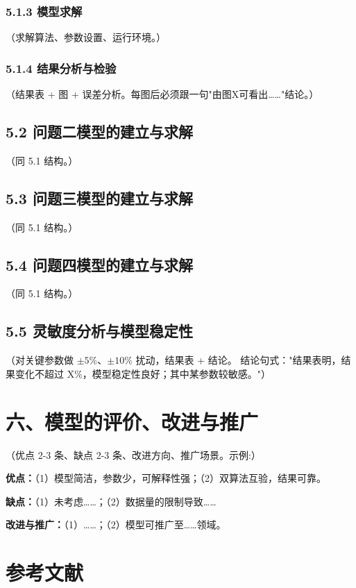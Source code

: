 \documentclass[12pt,a4paper,fontset=windows]{ctexart}
\begin{document}
\subsubsection*{5.1.3 模型求解}
（求解算法、参数设置、运行环境。）

\subsubsection*{5.1.4 结果分析与检验}
（结果表 + 图 + 误差分析。每图后必须跟一句"由图X可看出……"结论。）

\subsection*{5.2 问题二模型的建立与求解}
（同 5.1 结构。）

\subsection*{5.3 问题三模型的建立与求解}
（同 5.1 结构。）

\subsection*{5.4 问题四模型的建立与求解}
（同 5.1 结构。）

\subsection*{5.5 灵敏度分析与模型稳定性}
（对关键参数做 $\pm 5\%$、$\pm 10\%$ 扰动，结果表 + 结论。
结论句式："结果表明，结果变化不超过 X\%，模型稳定性良好；其中某参数较敏感。"）

\section*{六、模型的评价、改进与推广}

（优点 2-3 条、缺点 2-3 条、改进方向、推广场景。示例:）

\noindent\textbf{优点：}（1）模型简洁，参数少，可解释性强；（2）双算法互验，结果可靠。

\noindent\textbf{缺点：}（1）未考虑……；（2）数据量的限制导致……

\noindent\textbf{改进与推广：}（1）……；（2）模型可推广至……领域。

\section*{参考文献}
\end{document}
